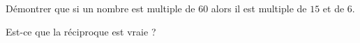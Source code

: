 
\begin{exercice}\label{exosmath-0788}

Démontrer que si un nombre est multiple de \( 60\) alors il est multiple de \( 15\) et de \( 6\).

Est-ce que la réciproque est vraie ?

\end{exercice}

